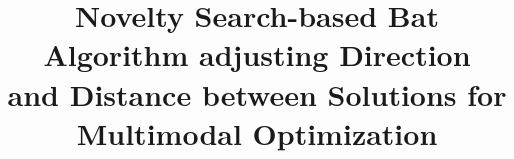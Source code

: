 \documentclass[sigconf]{acmart}
\begin{document}
\title{Novelty Search-based Bat Algorithm adjusting Direction \\ and Distance between Solutions for Multimodal Optimization}







\end{document}
